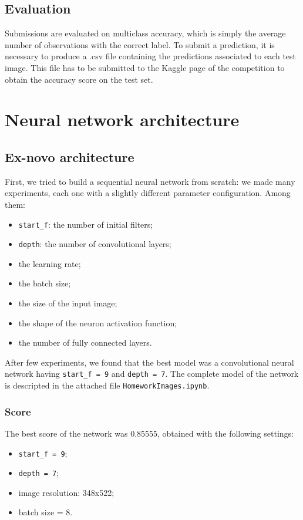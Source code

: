 \documentclass[12pt,a4paper]{report}
\begin{document}
	\section{Evaluation}
Submissions are evaluated on multiclass accuracy, which is simply the average number of observations with the correct label.
To submit a prediction, it is necessary to produce a .csv file containing the predictions associated to each test image. This file has to be submitted to the Kaggle page of the competition to obtain the accuracy score on the test set.


	\chapter{Neural network architecture}
		\section{Ex-novo architecture}
	First, we tried to build a sequential neural network from scratch: we made many experiments, each one with a slightly different parameter configuration. Among them:
			\begin{itemize}
				\item \texttt{start\_f}: the number of initial filters;
				\item \texttt{depth}: the number of convolutional layers;
				\item the learning rate;
				\item the batch size;
				\item the size of the input image;
				\item the shape of the neuron activation function;	
				\item the number of fully connected layers.
			\end{itemize}
	After few experiments, we found that the best model was a convolutional neural network having \texttt{start\_f = 9} and \texttt{depth = 7}. The complete model of the network is descripted in the attached file \texttt{HomeworkImages.ipynb}.
		\subsection{Score}
	The best score of the network was 0.85555, obtained with the following settings:
	\begin{itemize}
		\item	\texttt{start\_f = 9};
		\item	\texttt{depth = 7};
		\item image resolution: 348x522;
		\item batch size = 8.
	\end{itemize}
\end{document}

